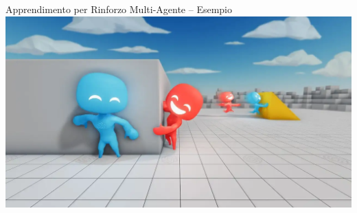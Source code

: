 \documentclass[presentation, 10pt,aspectratio=169]{beamer}\mode<presentation>{\usetheme{AMSBolognaFC}}
\begin{document}
\begin{frame}{Apprendimento per Rinforzo Multi-Agente -- Esempio}
	\href{https://www.youtube.com/watch?v=kopoLzvh5jY}{\includegraphics[width=\textwidth]{img/hide-and-seek.png}}
\end{frame}
\end{document}
